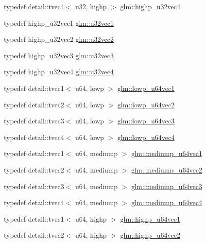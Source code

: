 \begin{DoxyCompactItemize}
typedef detail\+::tvec4$<$ u32, highp $>$ \hyperlink{group__gtc__type__precision_ga9418a8d549d344d4f7b7158771a2fdfe}{glm\+::highp\+\_\+u32vec4}
\item 
typedef highp\+\_\+u32vec1 \hyperlink{group__gtc__type__precision_gac8263c8c0bb36bc5c3d109f508e0fb41}{glm\+::u32vec1}
\item 
typedef highp\+\_\+u32vec2 \hyperlink{group__gtc__type__precision_gaa543e17450ca67dee12e2c41badfb3a7}{glm\+::u32vec2}
\item 
typedef highp\+\_\+u32vec3 \hyperlink{group__gtc__type__precision_ga7c88634a005904a441cba739d7cc4055}{glm\+::u32vec3}
\item 
typedef highp\+\_\+u32vec4 \hyperlink{group__gtc__type__precision_ga7e4574f8327a2f576baf2617343d0170}{glm\+::u32vec4}
\item 
typedef detail\+::tvec1$<$ u64, lowp $>$ \hyperlink{group__gtc__type__precision_gacd97dc5e92d0e2f6f6d62a5160508e2a}{glm\+::lowp\+\_\+u64vec1}
\item 
typedef detail\+::tvec2$<$ u64, lowp $>$ \hyperlink{group__gtc__type__precision_gae0e7d3ed32e8e79b4f6dd0c9baafcaea}{glm\+::lowp\+\_\+u64vec2}
\item 
typedef detail\+::tvec3$<$ u64, lowp $>$ \hyperlink{group__gtc__type__precision_gaa62794e3f055a333a85c0e52376f2429}{glm\+::lowp\+\_\+u64vec3}
\item 
typedef detail\+::tvec4$<$ u64, lowp $>$ \hyperlink{group__gtc__type__precision_ga1dc6d791a39dc52ee296a891d5b9b084}{glm\+::lowp\+\_\+u64vec4}
\item 
typedef detail\+::tvec1$<$ u64, mediump $>$ \hyperlink{group__gtc__type__precision_gaf4211dc9e211d57b34b45a612b6de193}{glm\+::mediump\+\_\+u64vec1}
\item 
typedef detail\+::tvec2$<$ u64, mediump $>$ \hyperlink{group__gtc__type__precision_ga9eda8d6f5be7a2919fb90412535b385f}{glm\+::mediump\+\_\+u64vec2}
\item 
typedef detail\+::tvec3$<$ u64, mediump $>$ \hyperlink{group__gtc__type__precision_ga7af0601e6a8ce71bd21ecf67971f5154}{glm\+::mediump\+\_\+u64vec3}
\item 
typedef detail\+::tvec4$<$ u64, mediump $>$ \hyperlink{group__gtc__type__precision_gae25a6609fa377ba1ec983ec32a91f1d4}{glm\+::mediump\+\_\+u64vec4}
\item 
typedef detail\+::tvec1$<$ u64, highp $>$ \hyperlink{group__gtc__type__precision_gab48ca217e1d1cc9aac3d9f037493ae7e}{glm\+::highp\+\_\+u64vec1}
\item 
typedef detail\+::tvec2$<$ u64, highp $>$ \hyperlink{group__gtc__type__precision_gad11667a4764867732a89791ec2a01aeb}{glm\+::highp\+\_\+u64vec2}

\end{DoxyCompactItemize}
